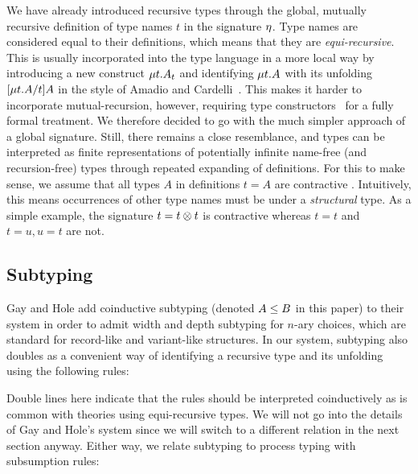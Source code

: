 \documentclass[submission,copyright,creativecommons]{eptcs}
\newcommand{\m}[1]{\mathsf{#1}}
\begin{document}
We have already introduced recursive types through the global, mutually recursive definition of type names $t$ in the signature $\eta$.  Type names are considered equal to their definitions, which means that they are \emph{equi-recursive}.  This is usually incorporated into the type language in a more local way by introducing a new construct $\mu{t} . {A_t}$ and identifying $\mu{t} . {A}$ with its unfolding $\lbrack{\mu{t} . {A}}/{t}\rbrack{A}$ in the style of Amadio and Cardelli~\cite{AmadioC91}. This makes it harder to incorporate mutual-recursion, however, requiring type constructors~\cite{Stone05un} for a fully formal treatment. We therefore decided to go with the much simpler approach of a global signature. Still, there remains a close resemblance, and types can be interpreted as finite representations of potentially infinite name-free (and recursion-free) types through repeated expanding of definitions. For this to make sense, we assume that all types $A$ in definitions $t = A$ are contractive \cite{Stone05un,
  GayH05}. Intuitively, this means occurrences of other type names must be under a \emph{structural} type. As a simple example, the signature $t = t \otimes t$ is contractive whereas $t = t$ and $t = u, u = t$ are not.

\subsection{Subtyping}
\label{original-subtyping}

Gay and Hole \cite{GayH05} add coinductive subtyping (denoted $A \le B$ in this paper) to their system in order to admit width and depth subtyping for $n$-ary choices, which are standard for record-like and variant-like structures. In our system, subtyping also doubles as a convenient way of identifying a recursive type and its unfolding using the following rules:
Double lines here indicate that the rules should be interpreted coinductively as is common with theories using equi-recursive types. We will not go into the details of Gay and Hole's system since we will switch to a different relation in the next section anyway. Either way, we relate subtyping to process typing with subsumption rules:
\end{document}
